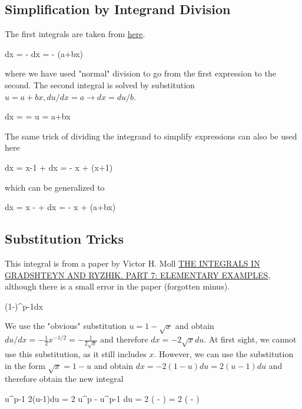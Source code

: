 
\subsection{Simplification by Integrand Division}

The first integrals are taken from
\href{http://folk.ntnu.no/oistes/Diverse/Integral\%20Kokeboken.pdf}{here}.

\bee
\int {} dx = \int {} -   dx =  -  \ln(a+bx)
\eee

where we have used "normal" division to go from the first expression to the second. The second integral is solved by substitution $u=a+bx, du/dx=a \rightarrow dx = du/b$.

\bee
\int {} dx = \int {}  =  \ln u =  \ln a+bx
\eee

The same trick of dividing the integrand to simplify expressions can also be used here

\bee
\int {} dx = \int x-1 +  dx =  - x + \ln(x+1)
\eee

which can be generalized to

\bee
\int {} dx = \int {}x -  +   dx =  - x +  \ln(a+bx)
\eee

\subsection{Substitution Tricks}

This integral is from a paper by Victor H. Moll \href{http://arxiv.org/abs/0707.2122v1}{THE INTEGRALS IN GRADSHTEYN AND RYZHIK. PART 7: ELEMENTARY EXAMPLES}, although there is a small error in the paper (forgotten minus).

\bee
\int (1-)^{p-1}dx
\eee

We use the "obvious" substitution $u=1-\sqrt{x}$ and obtain $du/dx = -\frac{1}{2}x^{-1/2} = - \frac{1}{2\sqrt{x}}$ and therefore $dx = -2\sqrt{x}du$. At first sight, we cannot use this substitution, as it still includes $x$. However, we can use the substitution in the form $\sqrt{x} = 1-u$ and obtain $dx = -2(1-u)du = 2(u-1)du$ and therefore obtain the new integral

\bee
\int u^{p-1} 2(u-1)du = 2 \int u^p - u^{p-1} du = 2 \left(  -  \right) = 2 \left(  -  \right)
\eee


